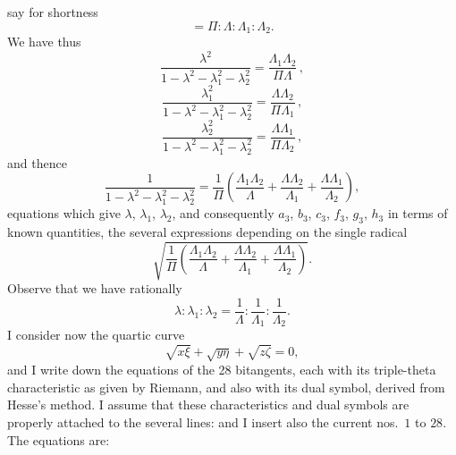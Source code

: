 \documentclass[11pt,a4paper]{article}
\begin{document}
\thispagestyle{plain}
\noindent say for shortness
\[
= \Pi : \Lambda : \Lambda_{1} : \Lambda_{2}.
\]
We have thus
\[
\frac{\lambda^{2}}{1 - \lambda^{2} - \lambda_{1}^{2} - \lambda_{2}^{2}} = \frac{\Lambda_{1}\Lambda_{2}}{\Pi\Lambda}\,,
\]
\[
\frac{\lambda_{1}^{2}}{1 - \lambda^{2} - \lambda_{1}^{2} - \lambda_{2}^{2}} = \frac{\Lambda\Lambda_{2}}{\Pi\Lambda_{1}}\,,
\]
\[
\frac{\lambda_{2}^{2}}{1 - \lambda^{2} - \lambda_{1}^{2} - \lambda_{2}^{2}} = \frac{\Lambda\Lambda_{1}}{\Pi\Lambda_{2}}\,,
\]
and thence
\[
\frac{1}{1 - \lambda^{2} - \lambda_{1}^{2} - \lambda_{2}^{2}} = \frac{1}{\Pi}\!\left(\frac{\Lambda_{1}\Lambda_{2}}{\Lambda} + \frac{\Lambda\Lambda_{2}}{\Lambda_{1}} + \frac{\Lambda\Lambda_{1}}{\Lambda_{2}}\right),
\]
equations which give $\lambda$, $\lambda_{1}$, $\lambda_{2}$, and consequently $a_{3}$, $b_{3}$, $c_{3}$, $f_{3}$, $g_{3}$, $h_{3}$ in terms of known quantities, the several expressions depending on the single radical
\[
\sqrt{\frac{1}{\Pi}\!\left(\frac{\Lambda_{1}\Lambda_{2}}{\Lambda} + \frac{\Lambda\Lambda_{2}}{\Lambda_{1}} + \frac{\Lambda\Lambda_{1}}{\Lambda_{2}}\right)}.
\]
Observe that we have rationally
\[
\lambda : \lambda_{1} : \lambda_{2} = \frac{1}{\Lambda} : \frac{1}{\Lambda_{1}} : \frac{1}{\Lambda_{2}}.
\]
I consider now the quartic curve
\[
\sqrt{x\xi} + \sqrt{y\eta} + \sqrt{z\zeta} = 0,
\]
and I write down the equations of the 28 bitangents, each with its triple-theta characteristic as given by Riemann, and also with its dual symbol, derived from Hesse's method.  I assume that these characteristics and dual symbols are properly attached to the several lines: and I insert also the current nos.\ $1$ to $28$.  The equations are:
\end{document}
